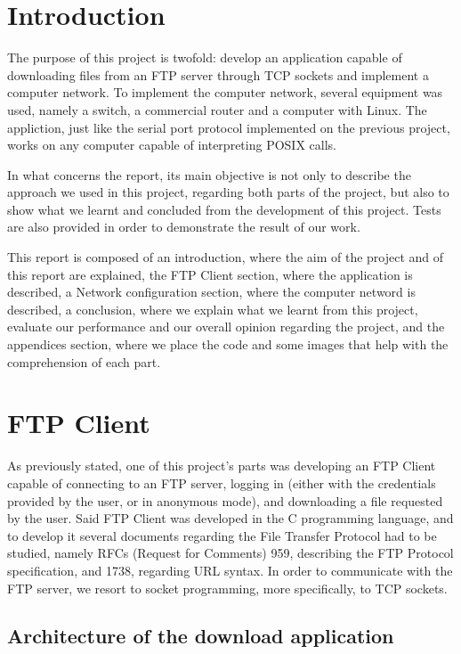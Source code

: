 \documentclass[11pt,a4paper,reqno]{article}
\numberwithin{equation}{section}
\begin{document}
\section{Introduction}

	The purpose of this project is twofold: develop an application capable of downloading files from an FTP server through TCP sockets and implement a computer network. To implement the computer network, several equipment was used, namely a switch, a commercial router and a computer with Linux. The appliction, just like the serial port protocol implemented on the previous project, works on any computer capable of interpreting POSIX calls.
	
	In what concerns the report, its main objective is not only to describe the approach we used in this project, regarding both parts of the project, but also to show what we learnt and concluded from the development of this project. Tests are also provided in order to demonstrate the result of our work.
	
	This report is composed of an introduction, where the aim of the project and of this report are explained, the FTP Client section, where the application is described, a Network configuration section, where the computer netword is described, a conclusion, where we explain what we learnt from this project, evaluate our performance and our overall opinion regarding the project, and the appendices section, where we place the code and some images that help with the comprehension of each part.

	\section{FTP Client}

	As previously stated, one of this project’s parts was developing an FTP Client capable of connecting to an FTP server, logging in (either with the credentials provided by the user, or in anonymous mode), and downloading a file requested by the user. Said FTP Client was developed in the C programming language, and to develop it several documents regarding the File Transfer Protocol had to be studied, namely RFCs (Request for Comments) 959, describing the FTP Protocol specification, and 1738, regarding URL syntax. In order to communicate with the FTP server, we resort to socket programming, more specifically, to TCP sockets.

	\subsection{Architecture of the download application}
\end{document}
